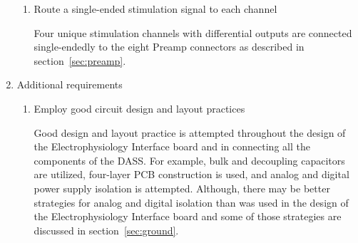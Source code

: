 \begin{enumerate}
\begin{enumerate}
	\item Route a single-ended stimulation signal to each channel
	
	Four unique stimulation channels with differential outputs are connected single-endedly to the eight Preamp connectors as described in section~\ref{sec:preamp}.
	
	\end{enumerate}
	
\item Additional requirements

	\begin{enumerate}
	
	
	\item Employ good circuit design and layout practices
	
	Good design and layout practice is attempted throughout the design of the Electrophysiology Interface board and in connecting all the components of the DASS.  For example, bulk and decoupling capacitors are utilized, four-layer PCB construction is used, and analog and digital power supply isolation is attempted.  Although, there may be better strategies for analog and digital isolation than was used in the design of the Electrophysiology Interface board and some of those strategies are discussed in section~\ref{sec:ground}.
	
	
	\end{enumerate}
	
\end{enumerate}
